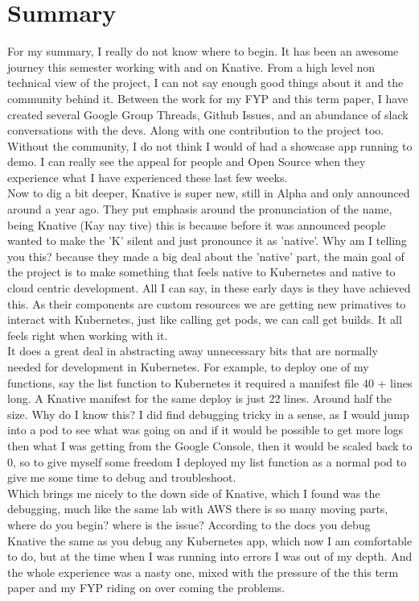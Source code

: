 \section{Summary}
For my summary, I really do not know where to begin. It has been an awesome journey this semester working with and on Knative. From a high level non technical view of the project, I can not say enough good things about it and the community behind it. Between the work for my FYP and this term paper, I have created several Google Group Threads, Github Issues, and an abundance of slack conversations with the devs. Along with one contribution to the project too. Without the community, I do not think I would of had a showcase app running to demo. I can really see the appeal for people and Open Source when they experience what I have experienced these last few weeks. 
\\Now to dig a bit deeper, Knative is super new, still in Alpha and only announced around a year ago. They put emphasis around the pronunciation of the name, being Knative (Kay nay tive) this is because before it was announced people wanted to make the 'K' silent and just pronounce it as 'native'. Why am I telling you this? because they made a big deal about the 'native' part, the main goal of the project is to make something that feels native to Kubernetes and native to cloud centric development. All I can say, in these early days is they have achieved this. As their components are custom resources we are getting new primatives to interact with Kubernetes, just like calling get pods, we can call get builds. It all feels right when working with it. 
\\It does a great deal in abstracting away unnecessary bits that are normally needed for development in Kubernetes. For example, to deploy one of my functions, say the list function to Kubernetes it required a manifest file 40 + lines long. A Knative manifest for the same deploy is just 22 lines. Around half the size. Why do I know this? I did find debugging tricky in a sense, as I would jump into a pod to see what was going on and if it would be possible to get more logs then what I was getting from the Google Console, then it would be scaled back to 0, so to give myself some freedom I deployed my list function as a normal pod to give me some time to debug and troubleshoot. 
\\Which brings me nicely to the down side of Knative, which I found was the debugging, much like the same lab with AWS there is so many moving parts, where do you begin? where is the issue? According to the docs you debug Knative the same as you debug any Kubernetes app, which now I am comfortable to do, but at the time when I was running into errors I was out of my depth. And the whole experience was a nasty one, mixed with the pressure of the this term paper and my FYP riding on over coming the problems.
